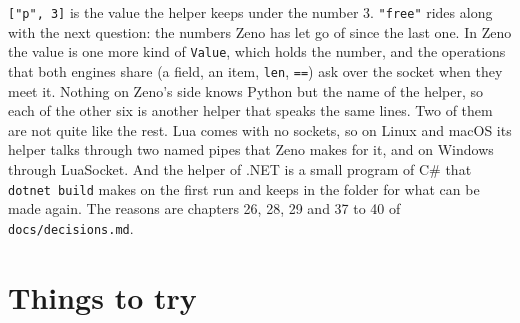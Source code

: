 \begin{zenofrag}[lang=shell]
{"op":"get","on":["p",3],"name":"year"}                 day.year
{"ok": 2026}
{"op":"call","on":["p",9],"args":["{oops"],"named":[],"free":[5,7]}
{"err": ["ValueError", "JSONDecodeError: Expecting ..."]}
\end{zenofrag}

\verb|["p", 3]| is the value the helper keeps under the number 3.
\verb|"free"| rides along with the next question: the numbers Zeno has
let go of since the last one. In Zeno the value is one more kind of
\verb|Value|, which holds the number, and the operations that both
engines share (a field, an item, \verb|len|, \verb|==|) ask over the
socket when they meet it. Nothing on Zeno's side knows Python but the
name of the helper, so each of the other six is another helper that
speaks the same lines. Two of them are not quite like the rest. Lua
comes with no sockets, so on Linux and macOS its helper talks through
two named pipes that Zeno makes for it, and on Windows through
LuaSocket. And the
helper of .NET is a small program of C\# that \verb|dotnet build|
makes on the first run and keeps in the folder for what can be made
again. The reasons are chapters 26, 28, 29 and 37 to 40 of
\verb|docs/decisions.md|.

\section{Things to try}

